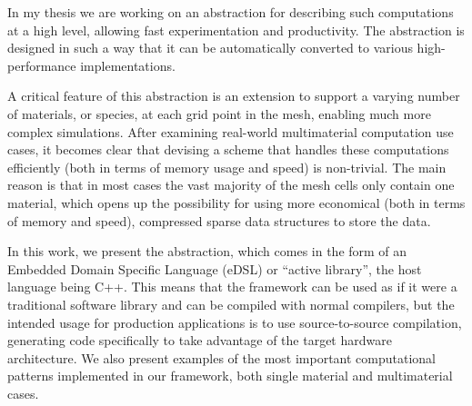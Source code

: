 \documentclass[fontsize=11pt, appendixprefix=true]{scrreprt}
\begin{document}
In my thesis we are working on an abstraction for describing such computations
at a high level, allowing fast experimentation and productivity. The abstraction
is designed in such a way that it can be automatically converted to various
high-performance implementations.

A critical feature of this abstraction is an extension to support a varying
number of materials, or species, at each grid point in the mesh, enabling much
more complex simulations. After examining real-world multimaterial computation
use cases, it becomes clear that devising a scheme that handles these
computations efficiently (both in terms of memory usage and speed) is
non-trivial. The main reason is that in most cases the vast majority of the mesh
cells only contain one material, which opens up the possibility for using more
economical (both in terms of memory and speed), compressed sparse data
structures to store the data.

In this work, we present the abstraction, which comes in the form of an Embedded
Domain Specific Language (eDSL) or ``active library'', the host language being
C++. This means that the framework can be used as if it were a traditional
software library and can be compiled with normal compilers, but the intended
usage for production applications is to use source-to-source compilation,
generating code specifically to take advantage of the target hardware
architecture. We also present examples of the most important computational
patterns implemented in our framework, both single material and multimaterial
cases.

\newpage
\end{document}
